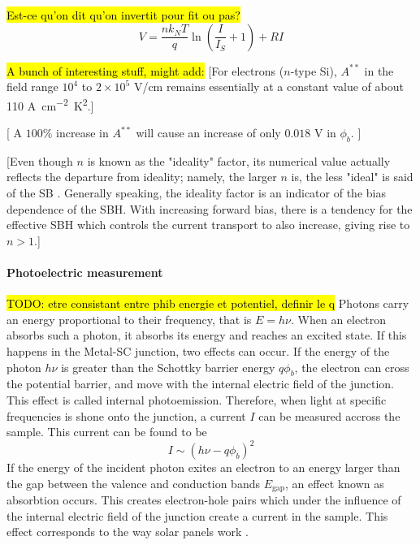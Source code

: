 \hl{Est-ce qu'on dit qu'on invertit pour fit ou pas?}
\begin{equation} \label{eq:IV-curve}
    V = \frac{n k_N T}{q} \ln \left( \frac{I}{I_S} +1 \right) + RI
\end{equation}

\hl{A bunch of interesting stuff, might add:}
[For electrons ($n$-type Si), $A^{**}$ in the field range $10^4$ to $2\times 10^5$ V/cm remains essentially at a constant value of about 110 \unit{A cm^{-2} K^2}.]

[ A $100 \%$ increase in $A^{**}$ will cause an increase of only $0.018$ V in $\phi_b$. ]


[Even though $n$ is known as the  "ideality" factor, its numerical value actually reflects the departure from ideality; namely, the larger $n$ is, the less "ideal" is said of the SB \cite{tung_recent_2001}.
Generally speaking, the ideality factor is an indicator of the bias dependence of the SBH. With increasing forward bias, there is a tendency for the effective SBH which controls the current transport to also increase, giving rise to $n > 1$.]


\paragraph{Photoelectric measurement}
\hl{TODO: etre consistant entre phib energie et potentiel, definir le q}
Photons carry an energy proportional to their frequency, that is $E = h \nu$.
When an electron absorbs such a photon, it absorbs its energy and reaches an excited state.
If this happens in the Metal-SC junction, two effects can occur.
If the energy of the photon $h\nu$ is greater than the Schottky barrier energy $q\phi_b$, the electron can cross the potential barrier, and move with the internal electric field of the junction.
This effect is called internal photoemission.
Therefore, when light at specific frequencies is shone onto the junction, a current $I$ can be measured accross the sample.
This current can be found to be \cite{notice}
\begin{equation}
    I \sim (h \nu - q \phi_b)^2
    \label{eq:fowler}
\end{equation}
If the energy of the incident photon exites an electron to an energy larger than the gap between the valence and conduction bands $E_\textrm{gap}$, an effect known as absorbtion occurs.
This creates electron-hole pairs which under the influence of the internal electric field of the junction create a current in the sample.
This effect corresponds to the way solar panels work \cite{notice}.


